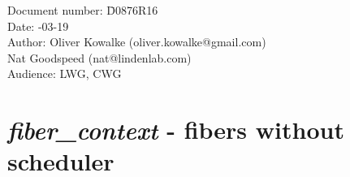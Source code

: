 \documentclass[fontsize=10pt,paper=A4,pagesize,DIV=15]{scrartcl}
\begin{document}
\small
\begin{tabbing}
    Document number: \= D0876R16\\
    Date:            -03-19\\
    Author:          \> Oliver Kowalke (oliver.kowalke@gmail.com)\\
                     \> Nat Goodspeed (nat@lindenlab.com)\\
    Audience:        \> LWG, CWG\\
\end{tabbing}

\section*{\emph{fiber\_context} - fibers without scheduler}


\tableofcontents




\newpage























\end{document}
